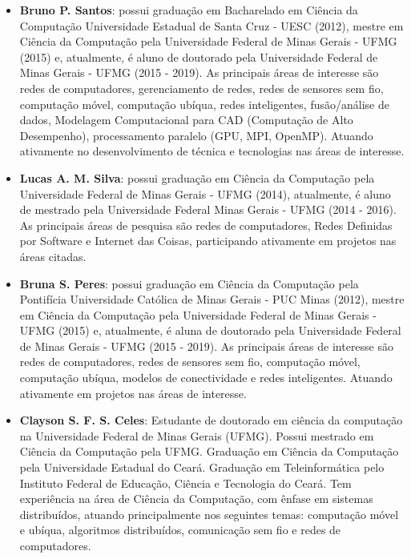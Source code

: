 \documentclass{SBCbookchapter}
\begin{document}
\begin{itemize}

\item \textbf{Bruno P. Santos}: possui graduação em Bacharelado em 
Ciência da Computação Universidade Estadual de Santa Cruz - UESC (2012), mestre 
em Ciência da Computação pela Universidade Federal de Minas Gerais - UFMG (2015) 
e, atualmente, é aluno de doutorado pela Universidade Federal de Minas Gerais - 
UFMG (2015 - 2019). As principais áreas de interesse são redes de computadores, 
gerenciamento de redes, redes de sensores sem fio, computação móvel, computação 
ubíqua, redes inteligentes, fusão/análise de dados, Modelagem Computacional para 
CAD (Computação de Alto Desempenho), processamento paralelo (GPU, MPI, OpenMP). 
Atuando ativamente no desenvolvimento de técnica e tecnologias nas áreas de 
interesse. 

\item \textbf{Lucas A. M. Silva}: possui graduação em Ciência da Computação 
pela Universidade Federal de Minas Gerais - UFMG (2014), atualmente, é aluno de 
mestrado pela Universidade Federal Minas Gerais - UFMG (2014 - 2016). As 
principais áreas de pesquisa são redes de computadores, Redes Definidas por 
Software e Internet das Coisas, participando ativamente em projetos nas áreas 
citadas.

\item \textbf{Bruna S. Peres}: possui graduação em Ciência da Computação pela 
Pontifícia Universidade Católica de Minas Gerais - PUC Minas (2012), mestre em 
Ciência da Computação pela Universidade Federal de Minas Gerais - UFMG (2015) e, 
atualmente, é aluna de doutorado pela Universidade Federal de Minas Gerais - 
UFMG (2015 - 2019). As principais áreas de interesse são redes de computadores, 
redes de sensores sem fio, computação móvel, computação ubíqua, modelos de 
conectividade e redes inteligentes. Atuando ativamente em projetos nas áreas de 
interesse. 

\item \textbf{Clayson S. F. S. Celes}: Estudante de doutorado em ciência da 
computação na Universidade Federal de Minas Gerais (UFMG). Possui mestrado em 
Ciência da Computação pela UFMG. Graduação em Ciência da Computação pela 
Universidade Estadual do Ceará. Graduação em Teleinformática pelo Instituto 
Federal de Educação, Ciência e Tecnologia do Ceará. Tem experiência na área de 
Ciência da Computação, com ênfase em sistemas distribuídos, atuando 
principalmente nos seguintes temas: computação móvel e ubíqua, algoritmos 
distribuídos, comunicação sem fio e redes de computadores.


\end{itemize}
\end{document}
